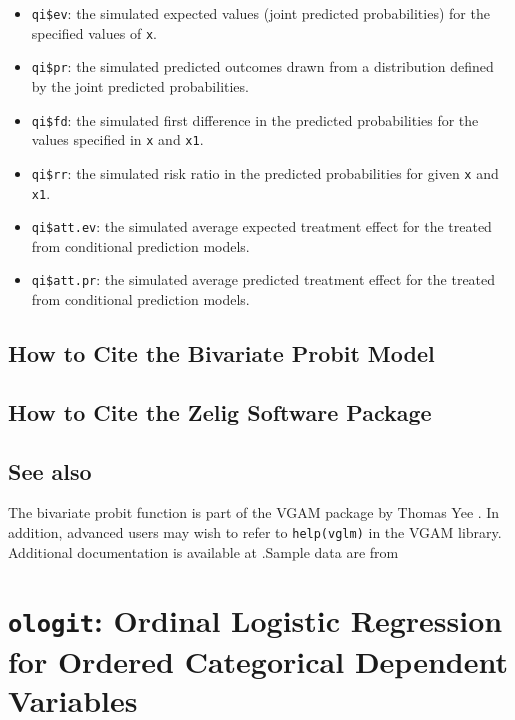 \documentclass{article}
\begin{document}
\begin{itemize}
   \begin{itemize}
   \item {\tt qi\$ev}: the simulated expected values (joint predicted
     probabilities) for the specified values of {\tt x}.
   \item {\tt qi\$pr}: the simulated predicted outcomes drawn from a
     distribution defined by the joint predicted probabilities.
   \item {\tt qi\$fd}: the simulated first difference in the predicted
     probabilities for the values specified in {\tt x} and {\tt x1}.
   \item {\tt qi\$rr}: the simulated risk ratio in the predicted
     probabilities for given {\tt x} and {\tt x1}.
   \item {\tt qi\$att.ev}: the simulated average expected treatment
     effect for the treated from conditional prediction models.  
   \item {\tt qi\$att.pr}: the simulated average predicted treatment
     effect for the treated from conditional prediction models.  
   \end{itemize}
\end{itemize}

\subsection*{How to Cite the Bivariate Probit Model}

\subsection*{How to Cite the Zelig Software Package}
\CiteZelig


\subsection*{See also}
The bivariate probit function is part of the VGAM package by Thomas Yee \citep{YeeHas03}. In addition, advanced users may wish to refer to \texttt{help(vglm)} 
in the VGAM library.  Additional documentation is available at
.Sample data are from \cite{Martin92}

\section{{\tt ologit}: Ordinal Logistic Regression for Ordered Categorical Dependent Variables}
\label{ologit}
\end{document}
